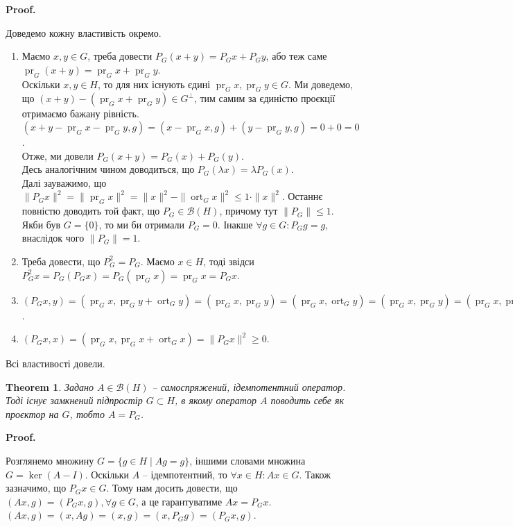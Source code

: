 \documentclass[a4paper, 10pt]{article}
\makeatletter
\theoremstyle{theoremdd}
\newtheorem{theorem}{Theorem}[subsection]
\theoremstyle{theoremdd}
\theoremstyle{theoremdd}
\theoremstyle{theoremdd}
\theoremstyle{theoremdd}
\theoremstyle{theoremdd}
\theoremstyle{theoremdd}
\theoremstyle{theoremdd}
\DeclareMathOperator{\ort}{ort}
\DeclareMathOperator{\pr}{pr}
\renewenvironment{proof}[1][Proof.\\]{\par
\pushQED{\hfill \qed}%
\normalfont \topsep6\p@\@plus6\p@\relax
\trivlist
\item\relax
{\bfseries
#1\@addpunct{.}}\hspace\labelsep\ignorespaces
}{%
\popQED\endtrivlist\@endpefalse
}
\makeatother
\begin{document}
\begin{proof}
Доведемо кожну властивість окремо.
\begin{enumerate}[wide=0pt,label={\arabic*)}]
\item Маємо $x,y \in G$, треба довести $P_G(x+y) = P_Gx + P_Gy$, або теж саме $\pr_G(x+y) = \pr_G x + \pr_G y$.\\
Оскільки $x,y \in H$, то для них існують єдині $\pr_G x,\pr_G y \in G$. Ми доведемо, що $(x+y) - (\pr_G x + \pr_G y) \in G^\perp$, тим самим за єдиністю проєкції отримаємо бажану рівність.\\
$(x+y - \pr_G x - \pr_G y, g) = (x - \pr_G x, g) + (y - \pr_G y, g) = 0 + 0 = 0$.\\
Отже, ми довели $P_G(x+y) = P_G(x) + P_G(y)$.\\
Десь аналогічним чином доводиться, що $P_G(\lambda x) = \lambda P_G(x)$.\\
Далі зауважимо, що $\|P_G x\|^2 = \| \pr_G x\|^2 = \|x\|^2 - \|\ort_G x\|^2 \leq 1 \cdot \|x\|^2$. Останнє повністю доводить той факт, що $P_G \in \mathcal{B}(H)$, причому тут $\|P_G\| \leq 1$. Якби був $G = \{0\}$, то ми би отримали $P_G = 0$. Інакше $\forall g \in G: P_G g = g$, внаслідок чого $\|P_G\| = 1$.

\item Треба довести, що $P_G^2 = P_G$. Маємо $x \in H$, тоді звідси \\
$P_G^2 x = P_G (P_G x) = P_G ( \pr_G x) = \pr_G x = P_G x$.

\item $(P_Gx, y) = (\pr_G x, \pr_G y  + \ort_G y) = (\pr_G x, \pr_G y) = (\pr_G x, \ort_G y) = (\pr_G x, \pr_G y) = (\pr_G x, \pr_G y) = (\ort_G x, \pr_G y) = (\pr_G x + \pr_G x, \pr_G y) = (x, P_G y)$.

\item $(P_G x, x) = (\pr_G x, \pr_G x + \ort_G x) = \|P_Gx\|^2 \geq 0$.
\end{enumerate}
Всі властивості довели.
\end{proof}

\begin{theorem}
Задано $A \in \mathcal{B}(H)$ -- самоспряжений, ідемпотентний оператор. Тоді існує замкнений підпростір $G \subset H$, в якому оператор $A$ поводить себе як проєктор на $G$, тобто $A = P_G$.
\end{theorem}

\begin{proof}
Розглянемо множину $G = \{g \in H \mid Ag = g\}$, іншими словами множина $G = \ker (A - I)$. Оскільки $A$ -- ідемпотентний, то $\forall x \in H: Ax \in G$. Також зазначимо, що $P_G x \in G$. Тому нам досить довести, що $(Ax,g) = (P_Gx,g), \forall g \in G$, а це гарантуватиме $Ax = P_Gx$.\\
$(Ax,g) = (x,Ag) = (x,g) = (x, P_G g) = (P_G x,g)$.
\end{proof}
\end{document}
